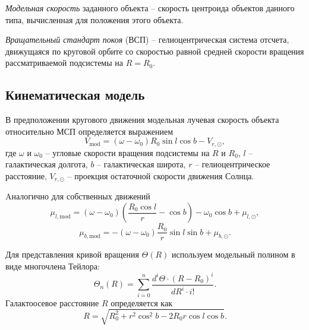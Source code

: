 \documentclass{matmex-diploma-custom}
\begin{document}
\textit{Модельная скорость} заданного объекта -- скорость центроида объектов данного типа, вычисленная для положения этого объекта.

\textit{Вращательный стандарт покоя} (ВСП) -- гелиоцентрическая система отсчета, движущаяся по круговой орбите со скоростью равной средней скорости вращения рассматриваемой подсистемы на $R = R_0$.




\subsection{Кинематическая модель}

В предположении кругового движения модельная лучевая скорость объекта относительно МСП определяется выражением \cite{3}
\begin{equation}
        V_{\mathrm{mod}} = (\omega - \omega_0) R_0 \sin{l} \cos{b} - V_{r, \odot},
\end{equation}
где $\omega$ и $\omega_0$ -- угловые скорости вращения подсистемы на $R$ и $R_0$, $l$ -- галактическая долгота, $b$ -- галактическая широта, $r$ -- гелиоцентрическое расстояние, $V_{r, \odot}$ -- проекция остаточной скорости движения Солнца.

Aналогично для собственных движений \cite{3}
\begin{equation}
        \mu_{l, \mathrm{mod}} = (\omega - \omega_0) \left( \frac{R_0\cos{l}}{r} - \cos{b} \right) - \omega_0 \cos{b} + \mu_{l, \odot},
\end{equation}
\begin{equation}
        \mu_{b, \mathrm{mod}} = - (\omega - \omega_0) \frac{R_0}{r} \sin{l} \sin{b} + \mu_{b, \odot}.
\end{equation}

\par Для представления кривой вращения $\Theta(R)$ используем модельный полином в виде многочлена Тейлора:
\begin{equation} \label{theta_n}
        \Theta_n(R)=\sum _{i=0}^{n} \frac{d^i\Theta \cdot (R - R_0)^i}{dR^i\cdot i!}.
\end{equation}
Галактоосевое расстояние $R$ определяется как \cite{3}
\begin{equation}
	R = \sqrt{R_0^2 + r^2 \cos^2{b} - 2R_0 r \cos{l} \cos{b}}.
\end{equation}
\end{document}
